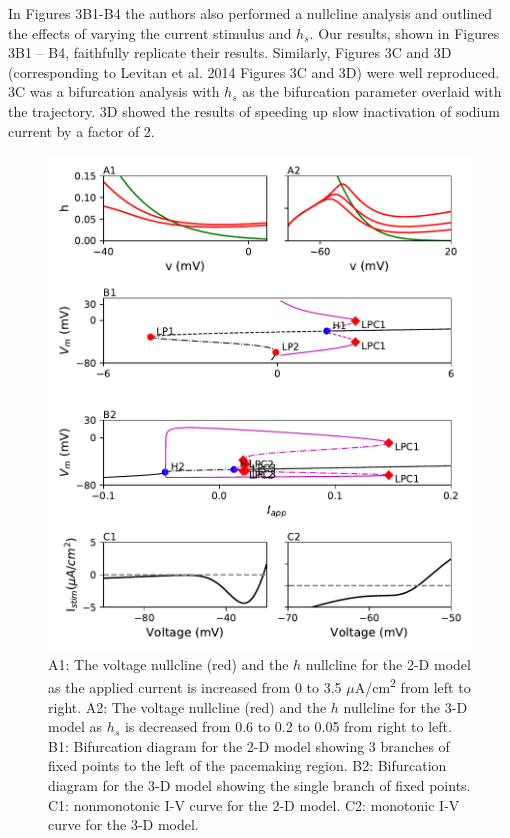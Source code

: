 In Figures 3B1-B4 the authors also performed a nullcline analysis and outlined the effects of varying the current stimulus and $h_s$. Our results, shown in Figures 3B1 – B4, faithfully replicate their results. Similarly, Figures 3C and 3D (corresponding to Levitan et al. 2014 Figures 3C and 3D) were well reproduced. 3C was a bifurcation analysis with $h_s$ as the bifurcation parameter overlaid with the trajectory. 3D showed the results of speeding up slow inactivation of sodium current by a factor of 2.\\ 


\begin{figure}
	\centering
	\includegraphics[scale=0.7]{../figures/figure_4.pdf}
	\caption{A1: The voltage nullcline (red) and the $h$ nullcline for the 2-D model as the applied current is increased from 0 to 3.5 $\mu$A/cm\textsuperscript{2} from left to right. A2: The voltage nullcline (red) and the $h$ nullcline for the 3-D model as $h_s$ is decreased from 0.6 to 0.2 to 0.05 from right to left. B1: Bifurcation diagram for the 2-D model showing 3 branches of fixed points to the left of the pacemaking region. B2: Bifurcation diagram for the 3-D model showing the single branch of fixed points. C1: nonmonotonic I-V curve for the 2-D model. C2: monotonic I-V curve for the 3-D model. }
	\label{fig:4}
\end{figure}

